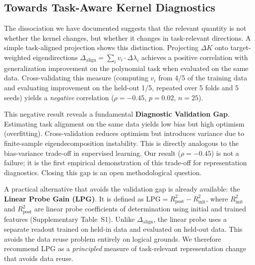 \documentclass[10pt]{article}
\begin{document}
\subsection{Towards Task-Aware Kernel Diagnostics}

The dissociation we have documented suggests that the relevant quantity is not whether the kernel changes, but whether it changes in task-relevant directions.  A simple task-aligned projection shows this distinction. Projecting $\Delta K$ onto target-weighted eigendirections $\Delta_{\text{align}} = \sum_i v_i \cdot \Delta\lambda_i$ achieves a positive correlation with generalization improvement on the polynomial task when evaluated on the same data.  Cross-validating this measure (computing $v_i$ from 4/5 of the training data and evaluating improvement on the held-out 1/5, repeated over 5 folds and 5 seeds) yields a \emph{negative} correlation ($\rho=-0.45$, $p=0.02$, $n=25$).

This negative result reveals a fundamental \textbf{Diagnostic Validation Gap}. Estimating task alignment on the same data yields low bias but high optimism (overfitting). Cross-validation reduces optimism but introduces variance due to finite-sample eigendecomposition instability. This is directly analogous to the bias-variance trade-off in supervised learning. Our result ($\rho=-0.45$) is not a failure; it is the first empirical demonstration of this trade-off for representation diagnostics. Closing this gap is an open methodological question.

A practical alternative that avoids the validation gap is already available: the \textbf{Linear Probe Gain (LPG)}. It is defined as $\text{LPG} = R^2_{\text{post}} - R^2_{\text{init}}$, where $R^2_{\text{init}}$ and $R^2_{\text{post}}$ are linear probe coefficients of determination using initial and trained features (Supplementary Table~S1). Unlike $\Delta_{\text{align}}$, the linear probe uses a separate readout trained on held-in data and evaluated on held-out data. This avoids the data reuse problem entirely on logical grounds. We therefore recommend LPG as a \emph{principled} measure of task-relevant representation change that avoids data reuse.
\end{document}
